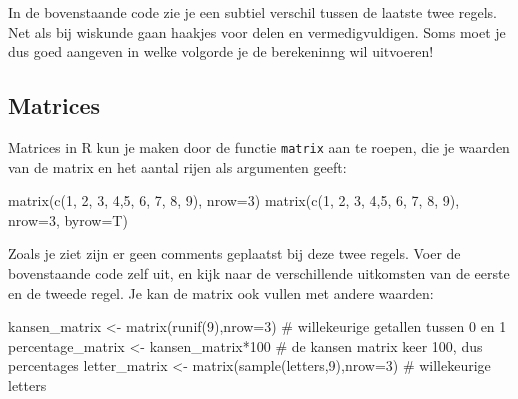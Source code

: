 \documentclass[
  a4paper,
]{scrbook}
\newenvironment{Shaded}{\begin{snugshade}}{\end{snugshade}}
\newcommand{\AttributeTok}[1]{\textcolor[rgb]{0.40,0.45,0.13}{#1}}
\newcommand{\CommentTok}[1]{\textcolor[rgb]{0.37,0.37,0.37}{#1}}
\newcommand{\DecValTok}[1]{\textcolor[rgb]{0.68,0.00,0.00}{#1}}
\newcommand{\FunctionTok}[1]{\textcolor[rgb]{0.28,0.35,0.67}{#1}}
\newcommand{\NormalTok}[1]{\textcolor[rgb]{0.00,0.23,0.31}{#1}}
\newcommand{\OtherTok}[1]{\textcolor[rgb]{0.00,0.23,0.31}{#1}}
\newcommand{\SpecialCharTok}[1]{\textcolor[rgb]{0.37,0.37,0.37}{#1}}
\theoremstyle{definition}
\theoremstyle{remark}
\begin{document}
In de bovenstaande code zie je een subtiel verschil tussen de laatste
twee regels. Net als bij wiskunde gaan haakjes voor delen en
vermedigvuldigen. Soms moet je dus goed aangeven in welke volgorde je de
berekeninng wil uitvoeren!

\hypertarget{matrices}{%
\subsection{Matrices}\label{matrices}}

Matrices in R kun je maken door de functie \texttt{matrix} aan te
roepen, die je waarden van de matrix en het aantal rijen als argumenten
geeft:

\begin{Shaded}
\begin{Highlighting}[]
\FunctionTok{matrix}\NormalTok{(}\FunctionTok{c}\NormalTok{(}\DecValTok{1}\NormalTok{, }\DecValTok{2}\NormalTok{, }\DecValTok{3}\NormalTok{, }\DecValTok{4}\NormalTok{,}\DecValTok{5}\NormalTok{, }\DecValTok{6}\NormalTok{, }\DecValTok{7}\NormalTok{, }\DecValTok{8}\NormalTok{, }\DecValTok{9}\NormalTok{), }\AttributeTok{nrow=}\DecValTok{3}\NormalTok{)}
\FunctionTok{matrix}\NormalTok{(}\FunctionTok{c}\NormalTok{(}\DecValTok{1}\NormalTok{, }\DecValTok{2}\NormalTok{, }\DecValTok{3}\NormalTok{, }\DecValTok{4}\NormalTok{,}\DecValTok{5}\NormalTok{, }\DecValTok{6}\NormalTok{, }\DecValTok{7}\NormalTok{, }\DecValTok{8}\NormalTok{, }\DecValTok{9}\NormalTok{), }\AttributeTok{nrow=}\DecValTok{3}\NormalTok{, }\AttributeTok{byrow=}\NormalTok{T)}
\end{Highlighting}
\end{Shaded}

Zoals je ziet zijn er geen comments geplaatst bij deze twee regels. Voer
de bovenstaande code zelf uit, en kijk naar de verschillende uitkomsten
van de eerste en de tweede regel. Je kan de matrix ook vullen met andere
waarden:

\begin{Shaded}
\begin{Highlighting}[]
\NormalTok{kansen\_matrix }\OtherTok{\textless{}{-}} \FunctionTok{matrix}\NormalTok{(}\FunctionTok{runif}\NormalTok{(}\DecValTok{9}\NormalTok{),}\AttributeTok{nrow=}\DecValTok{3}\NormalTok{) }\CommentTok{\# willekeurige getallen tussen 0 en 1}
\NormalTok{percentage\_matrix }\OtherTok{\textless{}{-}}\NormalTok{ kansen\_matrix}\SpecialCharTok{*}\DecValTok{100}   \CommentTok{\# de kansen matrix keer 100, dus percentages}
\NormalTok{letter\_matrix }\OtherTok{\textless{}{-}} \FunctionTok{matrix}\NormalTok{(}\FunctionTok{sample}\NormalTok{(letters,}\DecValTok{9}\NormalTok{),}\AttributeTok{nrow=}\DecValTok{3}\NormalTok{) }\CommentTok{\# willekeurige letters}
\end{Highlighting}
\end{Shaded}
\end{document}
